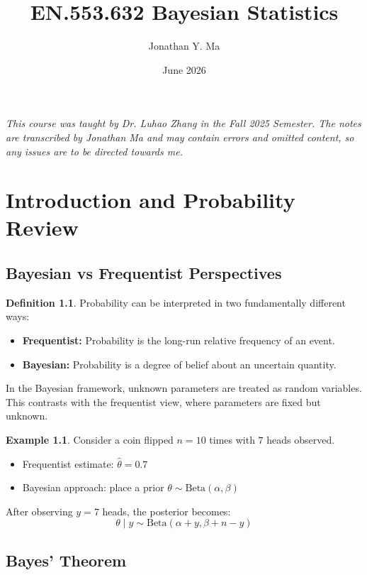 \documentclass[12pt,oneside]{book}
\title{EN.553.632 Bayesian Statistics}
\author{Jonathan Y. Ma}
\date{June 2026}
\numberwithin{equation}{section}
\theoremstyle{definition}
\newtheorem{definition}{Definition}[section]
\newtheorem{example}{Example}[section]
\theoremstyle{plain}
\theoremstyle{remark}
\newcommand{\BetaDist}{\mathrm{Beta}}
\begin{document}
\maketitle

\noindent \emph{This course was taught by Dr. Luhao Zhang in the Fall 2025 Semester. The notes are transcribed by Jonathan Ma and may contain errors and omitted content, so any issues are to be directed towards me.}

\tableofcontents
\chapter{Introduction and Probability Review}

\section{Bayesian vs Frequentist Perspectives}

\begin{definition}
Probability can be interpreted in two fundamentally different ways:
\begin{itemize}
    \item \textbf{Frequentist:} Probability is the long-run relative frequency of an event.
    \item \textbf{Bayesian:} Probability is a degree of belief about an uncertain quantity.
\end{itemize}
\end{definition}

In the Bayesian framework, unknown parameters are treated as random variables. This contrasts with the frequentist view, where parameters are fixed but unknown.

\begin{example}
Consider a coin flipped $n=10$ times with $7$ heads observed.

\begin{itemize}
    \item Frequentist estimate: $\hat{\theta} = 0.7$
    \item Bayesian approach: place a prior $\theta \sim \BetaDist(\alpha,\beta)$
\end{itemize}

After observing $y=7$ heads, the posterior becomes:
$$
\theta \mid y \sim \BetaDist(\alpha + y, \beta + n - y)
$$
\end{example}

\section{Bayes' Theorem}
\end{document}

